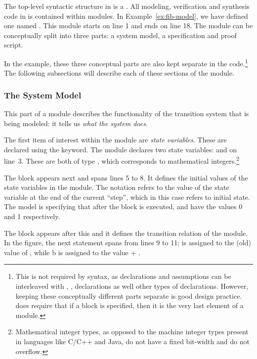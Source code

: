 The top-level syntactic structure in \uclid{} is a . All modeling, verification and synthesis code in \uclid{} is contained within modules. In Example~\ref{ex:fib-model}, we have defined one  named . This module starts on line 1 and ends on line 18. The module can be conceptually split into three parts: a system model, a specification and proof script. 

In the example, these three conceptual parts are also kept separate in the code.\footnote{This is not required by \uclid{} syntax, as  declarations and assumptions can be interleaved with , ,  declarations as well other types of declarations. However, keeping these conceptually different parts separate is good design practice. \uclid{} does require that if a  block is specified, then it is the very last element of a module.} The following subsections will describe each of these sections of the module. 

\subsubsection{The System Model}
This part of a \uclid{} module describes the functionality of the transition system that is being modeled: it tells us \emph{what the system does}.

The first item of interest within the module  are \emph{state variables}. These are declared using the  keyword. The module  declares two state variables:  and  on line~3. These are both of type , which corresponds to mathematical integers.\footnote{Mathematical integer types, as opposed to the machine integer types present in languages like C/C++ and Java, do not have a fixed bit-width and do not overflow.}

The  block appears next and spans lines 5 to 8. It defines the initial values of the state variables in the module. The notation  refers to the value of the state variable  at the end of the current ``step'', which in this case refers to initial state. The model is specifying that after the  block is executed,  and  have the values 0 and 1 respectively.

The  block appears after this and it defines the transition relation of the module. In the figure, the next statement spans from lines 9 to 11;  is assigned to the (old) value of , while b is assigned to the value  + .

